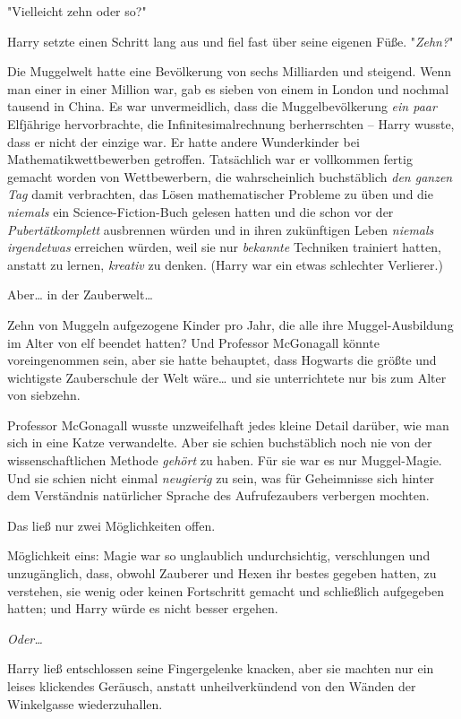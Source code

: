 {"Vielleicht zehn oder so?"

Harry setzte einen Schritt lang aus und fiel fast über seine eigenen Füße. "\emph{Zehn?}"

Die Muggelwelt hatte eine Bevölkerung von sechs Milliarden und steigend. Wenn man einer in einer Million war, gab es sieben von einem in London und nochmal tausend in China. Es war unvermeidlich, dass die Muggelbevölkerung \emph{ein paar} Elfjährige hervorbrachte, die Infinitesimalrechnung berherrschten -- Harry wusste, dass er nicht der einzige war. Er hatte andere Wunderkinder bei Mathematikwettbewerben getroffen. Tatsächlich war er vollkommen fertig gemacht worden von Wettbewerbern, die wahrscheinlich buchstäblich \emph{den ganzen Tag} damit verbrachten, das Lösen mathematischer Probleme zu üben und die \emph{niemals} ein Science-Fiction-Buch gelesen hatten und die schon vor der \emph{Pubertätkomplett} ausbrennen würden und in ihren zukünftigen Leben \emph{niemals irgendetwas} erreichen würden, weil sie nur \emph{bekannte} Techniken trainiert hatten, anstatt zu lernen, \emph{kreativ} zu denken. (Harry war ein etwas schlechter Verlierer.)

Aber… in der Zauberwelt…

Zehn von Muggeln aufgezogene Kinder pro Jahr, die alle ihre Muggel-Ausbildung im Alter von elf beendet hatten? Und Professor McGonagall könnte voreingenommen sein, aber sie hatte behauptet, dass Hogwarts die größte und wichtigste Zauberschule der Welt wäre… und sie unterrichtete nur bis zum Alter von siebzehn.

Professor McGonagall wusste unzweifelhaft jedes kleine Detail darüber, wie man sich in eine Katze verwandelte. Aber sie schien buchstäblich noch nie von der wissenschaftlichen Methode \emph{gehört} zu haben. Für sie war es nur Muggel-Magie. Und sie schien nicht einmal \emph{neugierig} zu sein, was für Geheimnisse sich hinter dem Verständnis natürlicher Sprache des Aufrufezaubers verbergen mochten.

Das ließ nur zwei Möglichkeiten offen.

Möglichkeit eins: Magie war so unglaublich undurchsichtig, verschlungen und unzugänglich, dass, obwohl Zauberer und Hexen ihr bestes gegeben hatten, zu verstehen, sie wenig oder keinen Fortschritt gemacht und schließlich aufgegeben hatten; und Harry würde es nicht besser ergehen.

\emph{Oder…}

Harry ließ entschlossen seine Fingergelenke knacken, aber sie machten nur ein leises klickendes Geräusch, anstatt unheilverkündend von den Wänden der Winkelgasse wiederzuhallen.

}
